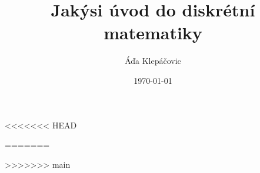 \documentclass[12pt, a4paper, oneside]{article}
\title{Jakýsi úvod do diskrétní matematiky}
\author{Áďa Klepáčovic}
\date{\today}
\begin{document}
<<<<<<< HEAD
\pagestyle{empty}
\sffamily
\createintro

\pagestyle{fancy}
\normalfont

% 
% 
% 


\appendix



=======
  \pagestyle{empty}
  \sffamily
  \createintro
 
  \pagestyle{fancy}
  \normalfont
 
  
>>>>>>> main
\end{document}
